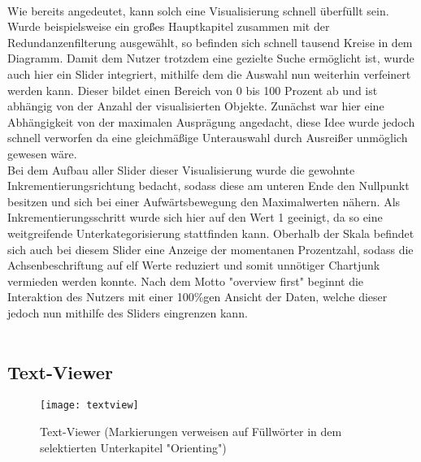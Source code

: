 \\
Wie bereits angedeutet, kann solch eine Visualisierung schnell \"uberf\"ullt sein. Wurde beispielsweise ein gro\"{\ss}es Hauptkapitel zusammen mit der Redundanzenfilterung ausgew\"ahlt, so befinden sich schnell tausend Kreise in dem Diagramm. Damit dem Nutzer trotzdem eine gezielte Suche erm\"oglicht ist, wurde auch hier ein Slider integriert, mithilfe dem die Auswahl nun weiterhin verfeinert werden kann. Dieser bildet einen Bereich von 0 bis 100 Prozent ab und ist abh\"angig von der Anzahl der visualisierten Objekte. Zun\"achst war hier eine Abh\"angigkeit von der maximalen Auspr\"agung angedacht, diese Idee wurde jedoch schnell verworfen da eine gleichm\"a{\ss}ige Unterauswahl durch Ausrei{\ss}er unm\"oglich gewesen w\"are.\\
Bei dem Aufbau aller Slider dieser Visualisierung wurde die gewohnte Inkrementierungsrichtung bedacht, sodass diese am unteren Ende den Nullpunkt besitzen und sich bei einer Aufw\"artsbewegung den Maximalwerten n\"ahern. Als Inkrementierungsschritt wurde sich hier auf den Wert 1 geeinigt, da so eine weitgreifende Unterkategorisierung stattfinden kann. Oberhalb der Skala befindet sich auch bei diesem Slider eine Anzeige der momentanen Prozentzahl, sodass die Achsenbeschriftung auf elf Werte reduziert und somit unn\"otiger Chartjunk vermieden werden konnte. Nach dem Motto "overview first" beginnt die Interaktion des Nutzers mit einer 100\%gen Ansicht der Daten, welche dieser jedoch nun mithilfe des Sliders eingrenzen kann.\\
\\

\subsection{Text-Viewer}
\begin{figure}[!htbp]
 \centering
 \texttt{[image: textview]}
 \caption{Text-Viewer (Markierungen verweisen auf F\"ullw\"orter in dem selektierten Unterkapitel "Orienting")}
 \label{fig:sunburst}
\end{figure}
